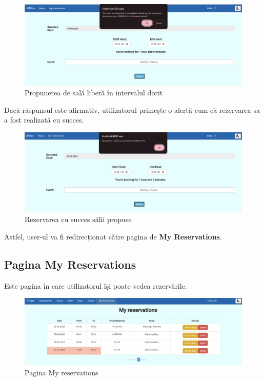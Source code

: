 \begin{figure}[!htb]
    \centering
    \includegraphics[width=0.9\linewidth]{images/sicily rezerv2.png}
    \caption{Propunerea de sală liberă în intervalul dorit}
    \label{fig:sicily rezerv2.png}
\end{figure}

Dacă răspunsul este afirmativ, utilizatorul primește o alertă cum că rezervarea sa a fost realizată cu succes.

\begin{figure}[!htb]
    \centering
    \includegraphics[width=0.9\linewidth]{images/sicily rezerv3.png}
    \caption{Rezervarea cu succes sălii propuse}
    \label{fig:sicily rezerv3.png}
\end{figure}

Astfel, user-ul va fi redirecționat către pagina de 
\textbf{My Reservations}.

\subsection{Pagina My Reservations}

Este pagina în care utilizatorul își poate vedea rezervările.

\begin{figure}[!htb]
    \centering
    \includegraphics[width=0.9\linewidth]{images/myres.png}
    \caption{Pagina My reservations}
    \label{fig:myres}
\end{figure}

